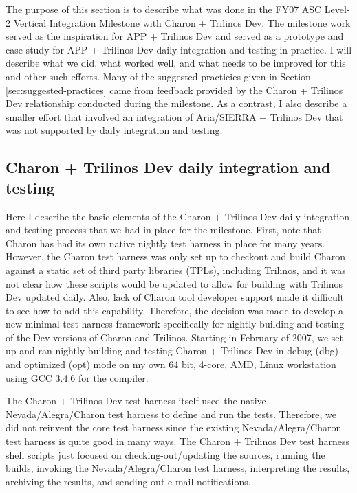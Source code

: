 \documentclass[pdf,ps2pdf,11pt]{SANDreport}
\begin{document}
The purpose of this section is to describe what was done in the FY07 ASC
Level-2 Vertical Integration Milestone with Charon + Trilinos Dev.  The
milestone work served as the inspiration for APP + Trilinos Dev and served as
a prototype and case study for APP + Trilinos Dev daily integration and
testing in practice.  I will describe what we did, what worked well, and what
needs to be improved for this and other such efforts.  Many of the suggested
practicies given in Section {}\ref{sec:suggested-practices} came from feedback
provided by the Charon + Trilinos Dev relationship conducted during the
milestone.  As a contrast, I also describe a smaller effort that involved an
integration of Aria/SIERRA + Trilinos Dev that was not supported by daily
integration and testing.


%
\subsection{Charon + Trilinos Dev daily integration and testing}
%

Here I describe the basic elements of the Charon + Trilinos Dev daily
integration and testing process that we had in place for the milestone.
First, note that Charon has had its own native nightly test harness in place
for many years.  However, the Charon test harness was only set up to checkout
and build Charon against a static set of third party libraries (TPLs),
including Trilinos, and it was not clear how these scripts would be updated to
allow for building with Trilinos Dev updated daily.  Also, lack of Charon tool
developer support made it difficult to see how to add this capability.
Therefore, the decision was made to develop a new minimal test harness
framework specifically for nightly building and testing of the Dev versions of
Charon and Trilinos.  Starting in February of 2007, we set up and ran nightly
building and testing Charon + Trilinos Dev in debug (dbg) and optimized (opt)
mode on my own 64 bit, 4-core, AMD, Linux workstation using GCC 3.4.6 for the
compiler.

The Charon + Trilinos Dev test harness itself used the native
Nevada/Alegra/Charon test harness to define and run the tests.  Therefore, we
did not reinvent the core test harness since the existing Nevada/Alegra/Charon
test harness is quite good in many ways.  The Charon + Trilinos Dev test
harness shell scripts just focused on checking-out/updating the sources,
running the builds, invoking the Nevada/Alegra/Charon test harness,
interpreting the results, archiving the results, and sending out e-mail
notifications.
\end{document}
